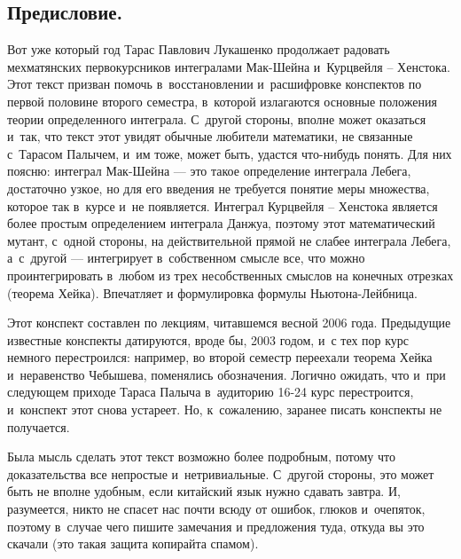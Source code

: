 \documentclass[draft]{article}
\begin{document}



\subsection{Предисловие.}

\bigskip

Вот уже который год Тарас Павлович Лукашенко продолжает радовать
мехматянских первокурсников интегралами Мак-Шейна и~Курцвейля --
Хенстока. Этот текст призван помочь в~восстановлении и~расшифровке
конспектов по первой половине второго семестра, в~которой излагаются
основные положения теории определенного интеграла. С~другой
стороны, вполне может оказаться и~так, что текст этот увидят обычные
любители математики, не связанные с~Тарасом Палычем, и~им тоже,
может быть, удастся что-нибудь понять. Для них поясню: интеграл
Мак-Шейна --- это такое определение интеграла Лебега, достаточно
узкое, но для его введения не требуется понятие меры множества,
которое так в~курсе и~не появляется. Интеграл Курцвейля -- Хенстока
является более простым определением интеграла Данжуа, поэтому этот
математический мутант, с~одной стороны, на действительной прямой не
слабее интеграла Лебега, а~с~другой --- интегрирует в~собственном
смысле все, что можно проинтегрировать в~любом из трех несобственных
смыслов на конечных отрезках (теорема Хейка). Впечатляет и
формулировка формулы Ньютона-Лейбница.

\smallskip

Этот конспект составлен по лекциям, читавшемся весной 2006 года.
Предыдущие известные конспекты датируются, вроде бы, 2003 годом, и~с
тех пор курс немного перестроился: например, во второй семестр
переехали теорема Хейка и~неравенство Чебышева, поменялись
обозначения. Логично ожидать, что и~при следующем приходе Тараса
Палыча в~аудиторию 16-24 курс перестроится, и~конспект этот снова
устареет. Но, к~сожалению, заранее писать конспекты не получается.

\smallskip

Была мысль сделать этот текст возможно более подробным, потому что
доказательства все непростые и~нетривиальные. С~другой стороны, это
может быть не вполне удобным, если китайский язык нужно сдавать
завтра. И, разумеется, никто не спасет нас почти всюду от ошибок,
глюков и~очепяток, поэтому в~случае чего пишите замечания и
предложения туда, откуда вы это скачали (это такая защита копирайта
спамом).
\end{document}
